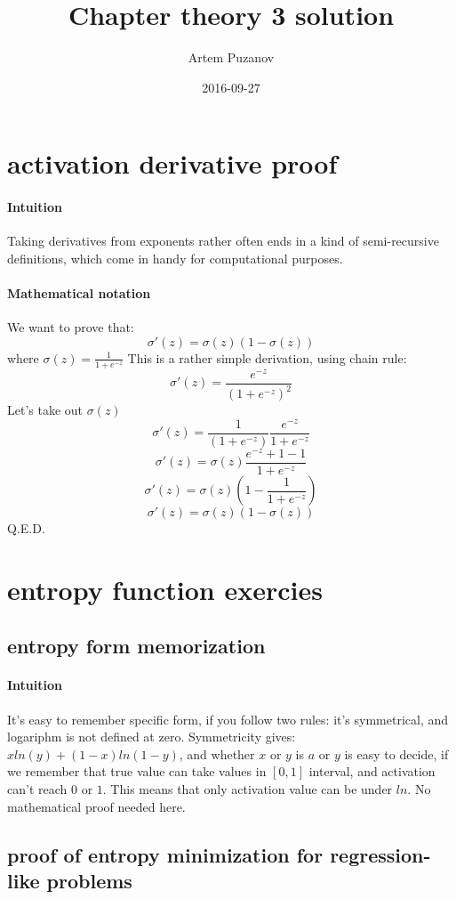 \documentclass{article}
\title{Chapter theory 3 solution}
\date{2016-09-27}
\author{Artem Puzanov}
\begin{document}
\maketitle
{}
\newpage
{}

\section{activation derivative proof}
\paragraph{Intuition}
Taking derivatives from exponents rather often ends in a kind of semi-recursive definitions, which come in handy for computational purposes.
\paragraph{Mathematical notation}
We want to prove that:
$$\sigma'(z) = \sigma(z)(1 - \sigma(z))$$
where $\sigma(z) = \frac{1}{1+e^{-z}}$
This is a rather simple derivation, using chain rule:
$$\sigma'(z) = \frac{e^{-z}}{(1 + e^{-z})^2}$$
Let's take out $\sigma(z)$
$$\sigma'(z) = \frac{1}{(1 + e^{-z})}\frac{e^{-z}}{1+e^{-z}}$$
$$\sigma'(z) = \sigma(z)\frac{e^{-z} + 1 - 1}{1+e^{-z}}$$
$$\sigma'(z) = \sigma(z)(1 - \frac{1}{1+e^{-z}})$$
$$\sigma'(z) = \sigma(z)(1 - \sigma(z))$$
Q.E.D.

\section{entropy function exercies}
\subsection{entropy form memorization}
\paragraph{Intuition}
It's easy to remember specific form, if you follow two rules: it's symmetrical, and logariphm is not defined at zero.
Symmetricity gives: $xln(y) + (1-x)ln(1-y)$, and whether $x$ or $y$ is $a$ or $y$ is easy to decide, if we remember that
true value can take values in $[0,1]$ interval, and activation can't reach $0$ or $1$. 
This means that only activation value can be under $ln$.
No mathematical proof needed here.
\subsection{proof of entropy minimization for regression-like problems}
\end{document}
